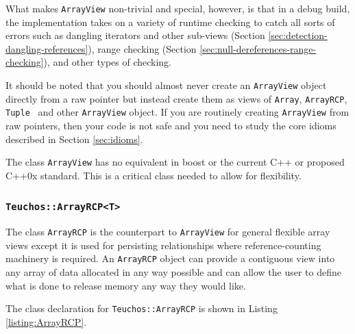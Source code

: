 \documentclass[pdf,ps2pdf,11pt]{SANDreport}
\begin{document}
What makes {}\texttt{ArrayView} non-trivial and special, however, is
that in a debug build, the implementation takes on a variety of
runtime checking to catch all sorts of errors such as dangling
iterators and other sub-views (Section
{}\ref{sec:detection-dangling-references}), range checking (Section
{}\ref{sec:null-dereferences-range-checking}), and other types of
checking.

It should be noted that you should almost never create an
{}\texttt{ArrayView} object directly from a raw pointer but instead
create them as views of {}\texttt{Array}, {}\texttt{ArrayRCP},
{}\texttt{Tuple } and other {}\texttt{ArrayView} object.  If you are
routinely creating {}\texttt{ArrayView} from raw pointers, then your
code is not safe and you need to study the core idioms described in
Section {}\ref{sec:idioms}.

The class {}\texttt{ArrayView} has no equivalent in boost or the
current C++ or proposed C++0x standard.  This is a critical class
needed to allow for flexibility.


%
{}\subsubsection{\texttt{Teuchos::ArrayRCP<T>}}
%

The class {}\texttt{ArrayRCP} is the counterpart to
{}\texttt{ArrayView} for general flexible array views except it is
used for persisting relationships where reference-counting machinery
is required.  An {}\texttt{ArrayRCP} object can provide a contiguous
view into any array of data allocated in any way possible and can
allow the user to define what is done to release memory any way they
would like.

The class declaration for {}\texttt{Teuchos::ArrayRCP} is shown in
Listing {}\ref{listing:ArrayRCP}.
\end{document}
